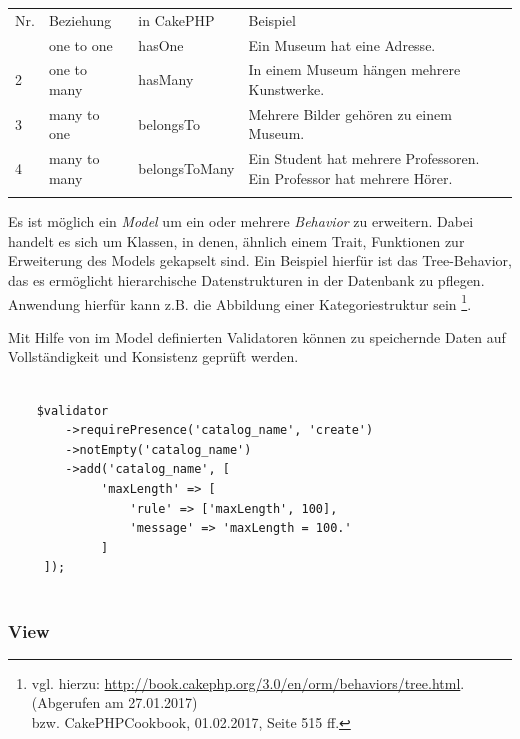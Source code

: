 	\begin{table}[!htbp]
		\begin{tabularx}{\textwidth}{p{1cm} X X p{8cm}}
			\cline{2-4}
			\rowcolor[HTML]{EFEFEF} 
			 Nr. & Beziehung & in CakePHP & Beispiel \\ \cline{1-4} \addlinespace
			1 & one to one & hasOne & Ein Museum hat eine Adresse. \\
			2 & one to many & hasMany & In einem Museum hängen mehrere Kunstwerke. \\
			3 & many to one & belongsTo & Mehrere Bilder gehören zu einem Museum. \\  
			4 & many to many & belongsToMany & Ein Student hat mehrere Professoren. Ein Professor hat mehrere Hörer. \\ \addlinespace \cline{1-4}     
		\end{tabularx}
	\end{table}
		
	
	
	
	Es ist möglich ein \textit{Model} um ein oder mehrere \textit{Behavior} zu erweitern. Dabei handelt es sich um Klassen, in denen, ähnlich einem Trait, Funktionen zur Erweiterung des Models gekapselt sind. Ein Beispiel hierfür ist das Tree-Behavior, das es ermöglicht hierarchische Datenstrukturen in der Datenbank zu pflegen. Anwendung hierfür kann z.B. die Abbildung einer Kategoriestruktur sein \footnote{vgl. hierzu: \url{http://book.cakephp.org/3.0/en/orm/behaviors/tree.html}. (Abgerufen am 27.01.2017) \\ bzw. CakePHPCookbook, 01.02.2017, Seite 515 ff. }. 
	
	Mit Hilfe von im Model definierten Validatoren können zu speichernde Daten auf Vollständigkeit und Konsistenz geprüft werden. 

	\lstset{language=PHP}
	\begin{lstlisting}[caption={Validator in CakePHP}] 

	$validator
     	->requirePresence('catalog_name', 'create')
     	->notEmpty('catalog_name')
     	->add('catalog_name', [
	         'maxLength' => [
	             'rule' => ['maxLength', 100],
	             'message' => 'maxLength = 100.'
	         ]
     ]);
	
	\end{lstlisting}
	
	\subsubsection{View}
	
